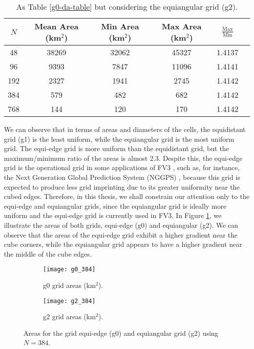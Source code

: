 \begin{table}[htbp]
    \centering
    \caption{As Table \ref{g0-da-table} but considering the equiangular grid (g2). \label{g2-da-table}}
    \begin{tabular}{cccccc}
        \toprule
        $N$ & Mean Area (km$^2$) & Min Area (km$^2$) & Max Area (km$^2$) & $\frac{\text{Max}}{\text{Min}}$ \\
        \midrule
        48 & 38269 & 32062 & 45327 & 1.4137 \\
        96 & 9393 & 7847 & 11096 & 1.4141 \\
        192 & 2327 & 1941 & 2745 & 1.4142 \\
        384 & 579 & 482 & 682 & 1.4142 \\
        768 & 144 & 120 & 170 & 1.4142 \\
        \bottomrule
    \end{tabular}
\end{table}


We can observe that in terms of areas and diameters of the cells, the equidistant grid (g1) is the least uniform,
while the equiangular grid  is the most uniform grid.
The equi-edge grid is more uniform than the equidistant grid, but the maximum/minimum ratio of the areas is almost 2.3. 
Despite this, the equi-edge grid is the operational grid in some applications of FV3 \citep{harris:2021,chen:2021}, such as, for instance, 
the Next Generation Global Prediction System (NGGPS) \citep{zhou:2019}, 
because this grid is expected to produce less grid imprinting due to its greater uniformity near the cubed edges.
Therefore, in this thesis, we shall constrain our attention only to the  equi-edge and equiangular grids, since the equiangular grid is ideally more uniform and the equi-edge grid  is currently used in FV3.
In Figure \ref{chp-cs-areas}, we illustrate the areas of both grids, equi-edge (g0) and equiangular (g2).
We can observe that the areas of the equi-edge grid exhibit a higher gradient near the cube corners, while the equiangular grid appears to have a higher gradient near the middle of the cube edges.
\begin{figure}[!htb]
	\centering
	\begin{subfigure}{0.48\textwidth}
		\texttt{[image: g0\_384]}
		\caption{g0 grid areas (km$^2$).}
	\end{subfigure}
	\begin{subfigure}{0.48\textwidth}
		\centering
		\texttt{[image: g2\_384]}
		\caption{g2 grid areas (km$^2$).}
	\end{subfigure}
	\caption{Areas for the grid equi-edge (g0) and equiangular grid (g2) using $N=384$.\label{chp-cs-areas}}
\end{figure}

